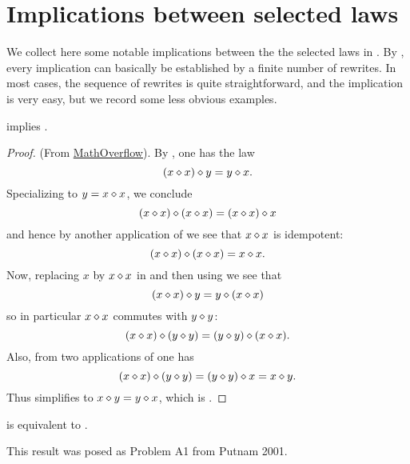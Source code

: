 \chapter{Implications between selected laws}\label{implications-chapter}

We collect here some notable implications between the the selected laws in .   By , every implication can basically be established by a finite number of rewrites.  In most cases, the sequence of rewrites is quite straightforward, and the implication is very easy, but we record some less obvious examples.

\begin{theorem}[387 implies 43]\label{387_implies_43}\leanok  {} implies .
\end{theorem}

\begin{proof}\leanok (From \href{https://mathoverflow.net/a/450905/766}{MathOverflow}).
  By , one has the law
\begin{equation}\label{387-again}
  (x \diamond x) \diamond y = y \diamond x.
\end{equation}
Specializing to $y=x \diamond x$, we conclude
$$(x \diamond x) \diamond (x \diamond x) = (x \diamond x) \diamond x$$
and hence by another application of  we see that $x \diamond x$ is idempotent:
\begin{equation}\label{idem}
  (x \diamond x) \diamond (x \diamond x) = x \diamond x.
\end{equation}
Now, replacing $x$ by $x \diamond x$ in  and then using  we see that
$$ (x \diamond x) \diamond y = y \diamond (x \diamond x)$$
so in particular $x \diamond x$ commutes with $y \diamond y$:
\begin{equation}\label{op-idem} (x \diamond x) \diamond (y \diamond y) = (y \diamond y) \diamond (x \diamond x).
\end{equation}
Also, from two applications of  one has
$$(x \diamond x) \diamond (y \diamond y) = (y \diamond y) \diamond x = x \diamond y.$$
Thus  simplifies to $x \diamond y = y \diamond x$, which is .
\end{proof}

\begin{theorem}[29 equivalent to 14]\label{29_equiv_14} \leanok  {} is equivalent to .
\end{theorem}

This result was posed as Problem A1 from Putnam 2001.

